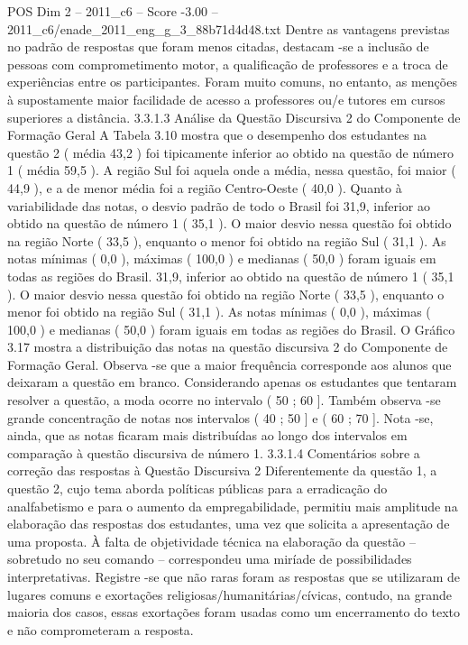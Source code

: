 \begin{textsample}{POS Dim 2 – 2011\_c6 – Score -3.00 – 2011\_c6/enade\_2011\_eng\_g\_3\_88b71d4d48.txt}
Dentre as vantagens previstas no padrão de respostas que foram menos citadas, destacam -se a inclusão de pessoas com comprometimento motor, a qualificação de professores e a troca de experiências entre os participantes.
Foram muito comuns, no entanto, as menções à supostamente maior facilidade de acesso a professores ou/e tutores em cursos superiores a distância. 3.3.1.3 Análise da Questão Discursiva 2 do Componente de Formação Geral A Tabela 3.10 mostra que o desempenho dos estudantes na questão 2 ( média 43,2 ) foi tipicamente inferior ao obtido na questão de número 1 ( média 59,5 ).
A região Sul foi aquela onde a média, nessa questão, foi maior ( 44,9 ), e a de menor média foi a região Centro-Oeste ( 40,0 ).
Quanto à variabilidade das notas, o desvio padrão de todo o Brasil foi 31,9, inferior ao obtido na questão de número 1 ( 35,1 ).
O maior desvio nessa questão foi obtido na região Norte ( 33,5 ), enquanto o menor foi obtido na região Sul ( 31,1 ).
As notas mínimas ( 0,0 ), máximas ( 100,0 ) e medianas ( 50,0 ) foram iguais em todas as regiões do Brasil. 31,9, inferior ao obtido na questão de número 1 ( 35,1 ).
O maior desvio nessa questão foi obtido na região Norte ( 33,5 ), enquanto o menor foi obtido na região Sul ( 31,1 ).
As notas mínimas ( 0,0 ), máximas ( 100,0 ) e medianas ( 50,0 ) foram iguais em todas as regiões do Brasil.
O Gráfico 3.17 mostra a distribuição das notas na questão discursiva 2 do Componente de Formação Geral.
Observa -se que a maior frequência corresponde aos alunos que deixaram a questão em branco.
Considerando apenas os estudantes que tentaram resolver a questão, a moda ocorre no intervalo ( 50 ; 60 ].
Também observa -se grande concentração de notas nos intervalos ( 40 ; 50 ] e ( 60 ; 70 ].
Nota -se, ainda, que as notas ficaram mais distribuídas ao longo dos intervalos em comparação à questão discursiva de número 1. 3.3.1.4 Comentários sobre a correção das respostas à Questão Discursiva 2 Diferentemente da questão 1, a questão 2, cujo tema aborda políticas públicas para a erradicação do analfabetismo e para o aumento da empregabilidade, permitiu mais amplitude na elaboração das respostas dos estudantes, uma vez que solicita a apresentação de uma proposta.
À falta de objetividade técnica na elaboração da questão – sobretudo no seu comando – correspondeu uma miríade de possibilidades interpretativas.
Registre -se que não raras foram as respostas que se utilizaram de lugares comuns e exortações religiosas/humanitárias/cívicas, contudo, na grande maioria dos casos, essas exortações foram usadas como um encerramento do texto e não comprometeram a resposta.

\end{textsample}
